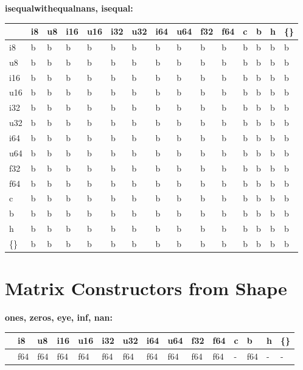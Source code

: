 \textbf{isequalwithequalnans, isequal:}
\begin{scriptsize}\begin{tt}\begin{center}\vspace{-.3cm}\begin{tabular}{|m{.65cm}||m{.65cm}|m{.65cm}|m{.65cm}|m{.65cm}|m{.65cm}|m{.65cm}|m{.65cm}|m{.65cm}|m{.65cm}|m{.65cm}|m{.65cm}|m{.65cm}|m{.65cm}|m{.65cm}|}\hline 
&i8&u8&i16&u16&i32&u32&i64&u64&f32&f64&c&b&h&\{\}\\ \hline \hline
i8&b&b&b&b&b&b&b&b&b&b&b&b&b&b\\ \hline
u8&b&b&b&b&b&b&b&b&b&b&b&b&b&b\\ \hline
i16&b&b&b&b&b&b&b&b&b&b&b&b&b&b\\ \hline
u16&b&b&b&b&b&b&b&b&b&b&b&b&b&b\\ \hline
i32&b&b&b&b&b&b&b&b&b&b&b&b&b&b\\ \hline
u32&b&b&b&b&b&b&b&b&b&b&b&b&b&b\\ \hline
i64&b&b&b&b&b&b&b&b&b&b&b&b&b&b\\ \hline
u64&b&b&b&b&b&b&b&b&b&b&b&b&b&b\\ \hline
f32&b&b&b&b&b&b&b&b&b&b&b&b&b&b\\ \hline
f64&b&b&b&b&b&b&b&b&b&b&b&b&b&b\\ \hline
c&b&b&b&b&b&b&b&b&b&b&b&b&b&b\\ \hline
b&b&b&b&b&b&b&b&b&b&b&b&b&b&b\\ \hline
h&b&b&b&b&b&b&b&b&b&b&b&b&b&b\\ \hline
\{\}&b&b&b&b&b&b&b&b&b&b&b&b&b&b\\ \hline
\end{tabular}\end{center}\end{tt}\end{scriptsize} 

\section{Matrix Constructors from Shape}

\textbf{ones, zeros, eye, inf, nan:}
\begin{scriptsize}\begin{tt}\begin{center}\vspace{-.3cm}\begin{tabular}{|m{.65cm}||m{.65cm}|m{.65cm}|m{.65cm}|m{.65cm}|m{.65cm}|m{.65cm}|m{.65cm}|m{.65cm}|m{.65cm}|m{.65cm}|m{.65cm}|m{.65cm}|m{.65cm}|m{.65cm}|}\hline 
&i8&u8&i16&u16&i32&u32&i64&u64&f32&f64&c&b&h&\{\}\\ \hline \hline
&f64&f64&f64&f64&f64&f64&f64&f64&f64&f64&-&f64&-&-\\ \hline
\end{tabular}\end{center}\end{tt}\end{scriptsize} 

